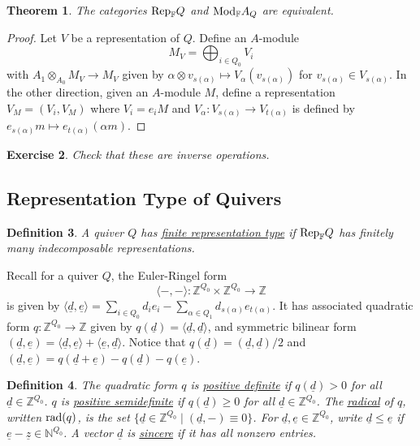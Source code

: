 \documentclass{book}
\newtheorem{theorem}{Theorem}[section]
\newtheorem{definition}[theorem]{Definition}
\newtheorem {exercise}[theorem] {Exercise}
\begin{document}
\begin{theorem}
The categories $\textnormal{Rep}_{\mathbb{F}}Q$ and $\textnormal{Mod}_{\mathbb{F}}A_Q$ are equivalent.
\end{theorem}

\begin{proof}
Let $V$ be a representation of $Q$. Define an $A$-module 
$$
M_V=\bigoplus_{i\in Q_0} V_i
$$
with $A_1\otimes_{A_0}M_V\to M_V$ given by $\alpha\otimes v_{s(\alpha)}\mapsto V_{\alpha}(v_{s(\alpha)})$ for $v_{s(\alpha)}\in V_{s(\alpha)}$. In the other direction, given an $A$-module $M$, define a representation $V_M=(V_i,V_M)$ where $V_i=e_iM$ and $V_{\alpha}:V_{s(\alpha)}\to V_{t(\alpha)}$ is defined by $e_{s(\alpha)}m\mapsto e_{t(\alpha)}(\alpha m)$.
\end{proof}

\begin{exercise}
Check that these are inverse operations.
\end{exercise}

\subsection{Representation Type of Quivers}

\begin{definition}
A quiver $Q$ has \underline{finite representation type} if $\textnormal{Rep}_{\mathbb{F}}Q$ has finitely many indecomposable representations.
\end{definition}

Recall for a quiver $Q$, the Euler-Ringel form
$$
\langle -, - \rangle: \mathbb{Z}^{Q_0}\times \mathbb{Z}^{Q_0}\to \mathbb{Z}
$$
is given by $\langle \underline{d}, \underline{e}\rangle=\sum_{i\in Q_0} d_ie_i - \sum_{\alpha\in Q_1} d_{s(\alpha)}e_{t(\alpha)}$. It has associated quadratic form $q:\mathbb{Z}^{Q_0}\to \mathbb{Z}$ given by $q(\underline{d})=\langle \underline{d},\underline{d}\rangle$, and symmetric bilinear form $(\underline{d},\underline{e})=\langle \underline{d}, \underline{e}\rangle+\langle \underline{e}, \underline{d}\rangle$. Notice that $q(\underline{d})=(\underline{d},\underline{d})/2$ and $(\underline{d},\underline{e})=q(\underline{d}+\underline{e})-q(\underline{d})-q(\underline{e})$.


\begin{definition}
The quadratic form $q$ is \underline{positive definite} if $q(\underline{d})>0$ for all $\underline{d}\in\mathbb{Z}^{Q_0}$. $q$ is \underline{positive semidefinite} if $q(\underline{d})\geq 0$ for all $\underline{d}\in \mathbb{Z}^{Q_0}$. The \underline{radical} of $q$, written $\textnormal{rad}(q)$, is the set $\{ \underline{d}\in \mathbb{Z}^{Q_0} \mid (\underline{d},-)\equiv 0 \}$. For $\underline{d},\underline{e}\in \mathbb{Z}^{Q_0}$, write $\underline{d}\leq \underline{e}$ if $\underline{e}-\underline{z}\in \mathbb{N}^{Q_0}$. A vector $\underline{d}$ is \underline{sincere} if it has all nonzero entries.
\end{definition}
\end{document}
